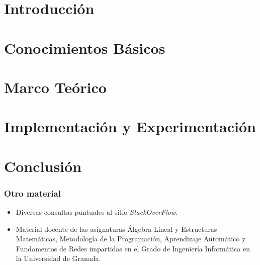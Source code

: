 \documentclass[a4paper,11pt]{book}
\begin{document}


\frontmatter
\tableofcontents
\listoffigures
\listoftables
\mainmatter

\part{Introducción}


\part{Conocimientos Básicos}

%



\part{Marco Teórico}


\part{Implementación y Experimentación}
%
%

\part{Conclusión}
%
%
%
%
%
%
\cleardoublepage
{}
{}


\section*{Otro material}
\begin{itemize}
  \item Diversas consultas puntuales al sitio \emph{StackOverFlow}.
  \item Material docente de las asignaturas Álgebra Lineal y Estructuras Matemáticas, Metodología de la Programación, Aprendizaje Automático y Fundamentos de Redes impartidas en el Grado de Ingeniería Informática en la Universidad de Granada.
\end{itemize}
\end{document}
